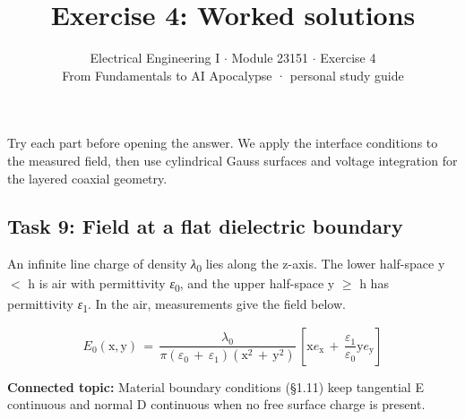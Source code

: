 \documentclass[11pt]{article}
\title{\sffamily\bfseries\color{FAUblue}Exercise 4: Worked solutions}
\author{Electrical Engineering I \ensuremath{\cdot} Module 23151 \ensuremath{\cdot} Exercise 4\\[2pt]\small From Fundamentals to AI Apocalypse · personal study guide}
\date{}
\begin{document}
\maketitle
\begingroup\footnotesize\setlength{\parskip}{0pt}\tableofcontents\endgroup
\clearpage

{\large Try each part before opening the answer. We apply the interface conditions to the measured field, then use cylindrical Gauss surfaces and voltage integration for the layered coaxial geometry.}


\begin{keepsection}
\section{Task 9: Field at a flat dielectric boundary}

An infinite line charge of density \textit{λ}\textsubscript{0} lies along the z-axis. The lower half-space y \ensuremath{<} h is air with permittivity \textit{ε}\textsubscript{0}, and the upper half-space y \ensuremath{\geq} h has permittivity \textit{ε}\textsubscript{1}. In the air, measurements give the field below.

\begin{equation*}{E}_{0}(\mathrm{x},\mathrm{y})\, =\, \dfrac{{λ}_{0}}{π({ε}_{0}\, +\, {ε}_{1})(\mathrm{x}^{2}\, +\, \mathrm{y}^{2})}\, \left[\mathrm{x}{e}_{\mathrm{x}}\, +\, \dfrac{{ε}_{1}}{{ε}_{0}}\mathrm{y}{e}_{\mathrm{y}}\right]\end{equation*}

\textbf{Connected topic:} Material boundary conditions (§1.11) keep tangential E continuous and normal D continuous when no free surface charge is present.


\end{keepsection}
\end{document}
